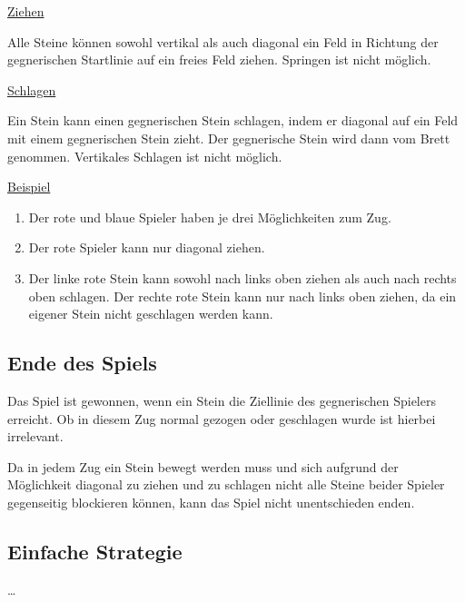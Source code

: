 \underline{Ziehen}

Alle Steine können sowohl vertikal als auch diagonal ein Feld in Richtung der gegnerischen Startlinie auf ein freies Feld ziehen. Springen ist nicht möglich.
\medskip

\underline{Schlagen}

Ein Stein kann einen gegnerischen Stein schlagen, indem er diagonal auf ein Feld mit einem gegnerischen Stein zieht. Der gegnerische Stein wird dann vom Brett genommen. Vertikales Schlagen ist nicht möglich.
\newpage

\underline{Beispiel}

\begin{center}
 \hfill  \hfill 
\end{center}
\begin{enumerate}[label=\alph*)]
\item Der rote und blaue Spieler haben je drei Möglichkeiten zum Zug.
\item Der rote Spieler kann nur diagonal ziehen.
\item Der linke rote Stein kann sowohl nach links oben ziehen als auch nach rechts oben schlagen. Der rechte rote Stein kann nur nach links oben ziehen, da ein eigener Stein nicht geschlagen werden kann.
\end{enumerate}

\subsection*{Ende des Spiels}
Das Spiel ist gewonnen, wenn ein Stein die Ziellinie des gegnerischen Spielers erreicht. Ob in diesem Zug normal gezogen oder geschlagen wurde ist hierbei irrelevant.

Da in jedem Zug ein Stein bewegt werden muss und sich aufgrund der Möglichkeit diagonal zu ziehen und zu schlagen nicht alle Steine beider Spieler gegenseitig blockieren können, kann das Spiel nicht unentschieden enden.

\subsection*{Einfache Strategie}
\dots